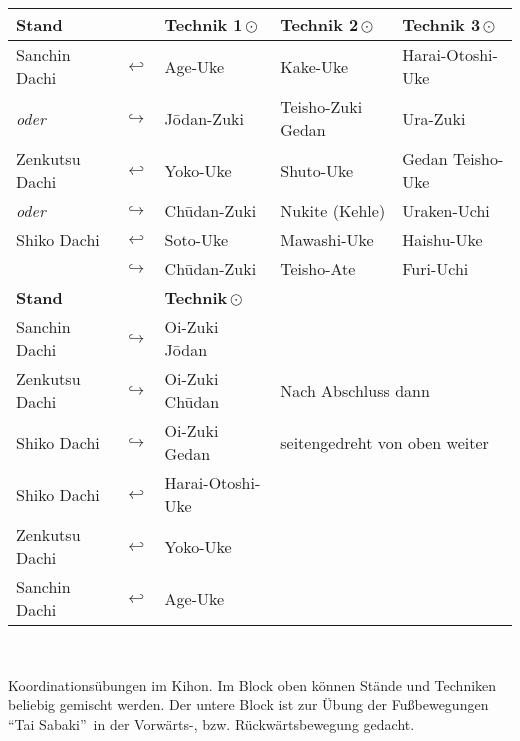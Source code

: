 	\setlength{\tabcolsep}{3pt}		
	\null\vfill\null
	\begin{tabularx}{\textwidth}{llXXX}
		\textbf{Stand} 		& & \textbf{Technik 1\,\(\odot\)} 	& \textbf{Technik 2\,\(\odot\)} 	& \textbf{Technik 3\,\(\odot\)}\\
		\midrule
		Sanchin Dachi 		& \(\hookleftarrow\)	& Age-Uke				& Kake-Uke 				& Harai-Otoshi-Uke	\\
		\textit{oder}		& \(\hookrightarrow\) 	& J\={o}dan-Zuki 		& Teisho-Zuki Gedan		& Ura-Zuki			\\
		Zenkutsu Dachi		& \(\hookleftarrow\)	& Yoko-Uke 				& Shuto-Uke 			& Gedan Teisho-Uke	\\
		\textit{oder}		& \(\hookrightarrow\)	& Ch\={u}dan-Zuki 		& Nukite (Kehle) 		& Uraken-Uchi		\\
		Shiko Dachi			& \(\hookleftarrow\)	& Soto-Uke 				& Mawashi-Uke 			& Haishu-Uke		\\
		& \(\hookrightarrow\)	& Ch\={u}dan-Zuki	& Teisho-Ate 			& Furi-Uchi			\\
		\midrule
		\textbf{Stand} 		& & \textbf{Technik\,\(\odot\)} 		&  						&\\
		\midrule
		Sanchin Dachi 		& \(\hookrightarrow\)	& Oi-Zuki J\={o}dan 	&  						&\\
		Zenkutsu Dachi		& \(\hookrightarrow\)	& Oi-Zuki Ch\={u}dan 	&\multicolumn{2}{l}{Nach Abschluss dann}\\
		Shiko Dachi			& \(\hookrightarrow\)	& Oi-Zuki Gedan 		&\multicolumn{2}{l}{seitengedreht von oben weiter}\\
		Shiko Dachi			& \(\hookleftarrow\)	& Harai-Otoshi-Uke 		&  						&\\
		Zenkutsu Dachi		& \(\hookleftarrow\)	& Yoko-Uke 				&  						&\\
		Sanchin Dachi		& \(\hookleftarrow\)	& Age-Uke 				&  						&\\
	\end{tabularx}\\\null\vfill\null
	\setlength{\tabcolsep}{6pt}	
	\begin{center}
		\parbox{\textwidth-2\tabcolsep}{Koordinationsübungen im Kihon. Im Block oben können Stände und Techniken beliebig gemischt werden. Der untere Block ist zur Übung der Fußbewegungen \textquotedblleft Tai Sabaki\textquotedblright~in der Vorwärts-, bzw. Rückwärtsbewegung gedacht.}
	\end{center}\null\vfill\null